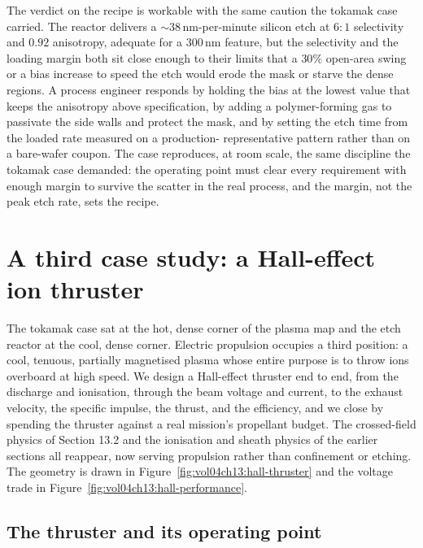 The verdict on the recipe is workable with the same caution the tokamak
case carried. The reactor delivers a $\sim 38\,\si{\nano\meter}$-per-minute
silicon etch at $6{:}1$ selectivity and $0.92$ anisotropy, adequate for a
$300\,\si{\nano\meter}$ feature, but the selectivity and the loading margin
both sit close enough to their limits that a $30\%$ open-area swing or a
bias increase to speed the etch would erode the mask or starve the dense
regions. A process engineer responds by holding the bias at the lowest
value that keeps the anisotropy above specification, by adding a
polymer-forming gas to passivate the side walls and protect the mask, and
by setting the etch time from the loaded rate measured on a production-
representative pattern rather than on a bare-wafer coupon. The case
reproduces, at room scale, the same discipline the tokamak case demanded:
the operating point must clear every requirement with enough margin to
survive the scatter in the real process, and the margin, not the peak etch
rate, sets the recipe.

\section{A third case study: a Hall-effect ion thruster}

The tokamak case sat at the hot, dense corner of the plasma map and the etch
reactor at the cool, dense corner. Electric propulsion occupies a third
position: a cool, tenuous, partially magnetised plasma whose entire purpose
is to throw ions overboard at high speed. We design a Hall-effect thruster
end to end, from the discharge and ionisation, through the beam voltage and
current, to the exhaust velocity, the specific impulse, the thrust, and the
efficiency, and we close by spending the thruster against a real mission's
propellant budget. The crossed-field physics of Section 13.2 and the
ionisation and sheath physics of the earlier sections all reappear, now
serving propulsion rather than confinement or etching. The geometry is drawn
in Figure~\ref{fig:vol04ch13:hall-thruster} and the voltage trade in
Figure~\ref{fig:vol04ch13:hall-performance}.



\subsection{The thruster and its operating point}

